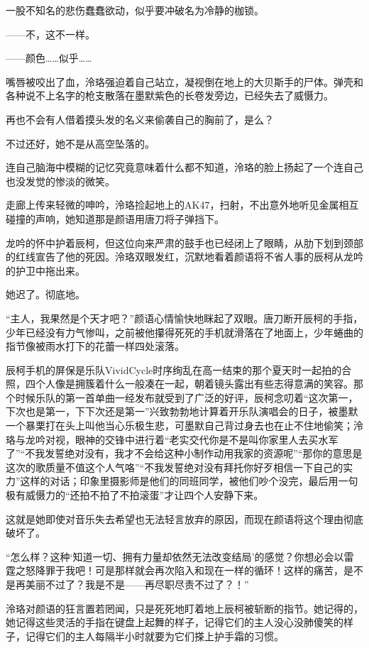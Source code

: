 \documentclass[UTF8, scheme = chinese, openany]{ctexbook}
\begin{document}
一股不知名的悲伤蠢蠢欲动，似乎要冲破名为冷静的枷锁。

——不，这不一样。

——颜色……似乎……

嘴唇被咬出了血，泠珞强迫着自己站立，凝视倒在地上的大贝斯手的尸体。弹壳和各种说不上名字的枪支散落在墨默紫色的长卷发旁边，已经失去了威慑力。

再也不会有人借着摸头发的名义来偷袭自己的胸前了，是么？

不过还好，她不是从高空坠落的。

连自己脑海中模糊的记忆究竟意味着什么都不知道，泠珞的脸上扬起了一个连自己也没发觉的惨淡的微笑。

走廊上传来轻微的呻吟，泠珞捡起地上的AK47，扫射，不出意外地听见金属相互碰撞的声响，她知道那是颜语用唐刀将子弹挡下。

龙吟的怀中护着辰柯，但这位向来严肃的鼓手也已经闭上了眼睛，从肋下划到颈部的红线宣告了他的死因。泠珞双眼发红，沉默地看着颜语将不省人事的辰柯从龙吟的护卫中拖出来。

她迟了。彻底地。

“主人，我果然是个天才吧？”颜语心情愉快地眯起了双眼。唐刀断开辰柯的手指，少年已经没有力气惨叫，之前被他攥得死死的手机就滑落在了地面上，少年蜷曲的指节像被雨水打下的花蕾一样四处滚落。

辰柯手机的屏保是乐队VividCycle时序绚乱在高一结束的那个夏天时一起拍的合照，四个人像是拥簇着什么一般凑在一起，朝着镜头露出有些志得意满的笑容。那个时候乐队的第一首单曲一经发布就受到了广泛的好评，辰柯念叨着“这次第一，下次也是第一，下下次还是第一”兴致勃勃地计算着开乐队演唱会的日子，被墨默一个暴栗打在头上叫他当心乐极生悲，可墨默自己背过身去也在止不住地偷笑；泠珞与龙吟对视，眼神的交锋中进行着“老实交代你是不是叫你家里人去买水军了”“不我发誓绝对没有，我才不会给这种小制作动用我家的资源呢”“那你的意思是这次的歌质量不值这个人气咯”“不我发誓绝对没有拜托你好歹相信一下自己的实力”这样的对话；印象里摄影师是他们的同班同学，被他们吵个没完，最后用一句极有威慑力的“还拍不拍了不拍滚蛋”才让四个人安静下来。

这就是她即使对音乐失去希望也无法轻言放弃的原因，而现在颜语将这个理由彻底破坏了。

“怎么样？这种‘知道一切、拥有力量却依然无法改变结局’的感觉？你想必会以雷霆之怒降罪于我吧！可是那样就会再次陷入和现在一样的循环！这样的痛苦，是不是再美丽不过了？我是不是——再尽职尽责不过了？！”

泠珞对颜语的狂言置若罔闻，只是死死地盯着地上辰柯被斩断的指节。她记得的，她记得这些灵活的手指在键盘上起舞的样子，记得它们的主人没心没肺傻笑的样子，记得它们的主人每隔半小时就要为它们搽上护手霜的习惯。
\end{document}

